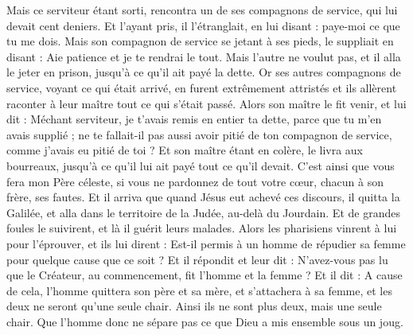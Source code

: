 \begin{multicols}{2}
Mais ce serviteur étant sorti, rencontra un de ses compagnons de service, qui lui devait cent deniers. Et l'ayant pris, il l'étranglait, en lui disant : paye-moi ce que tu me dois.
Mais son compagnon de service se jetant à ses pieds, le suppliait en disant : Aie patience et je te rendrai le tout.
Mais l'autre ne voulut pas, et il alla le jeter en prison, jusqu'à ce qu'il ait payé la dette.
Or ses autres compagnons de service, voyant ce qui était arrivé, en furent extrêmement attristés et ils allèrent raconter à leur maître tout ce qui s'était passé.
Alors son maître le fit venir, et lui dit : Méchant serviteur, je t'avais remis en entier ta dette, parce que tu m'en avais supplié ;
ne te fallait-il pas aussi avoir pitié de ton compagnon de service, comme j'avais eu pitié de toi ?
Et son maître étant en colère, le livra aux bourreaux, jusqu'à ce qu'il lui ait payé tout ce qu'il devait.
C'est ainsi que vous fera mon Père céleste, si vous ne pardonnez de tout votre cœur, chacun à son frère, ses fautes.
\VerseOne{}Et il arriva que quand Jésus eut achevé ces discours, il quitta la Galilée, et alla dans le territoire de la Judée, au-delà du Jourdain.
Et de grandes foules le suivirent, et là il guérit leurs malades.
Alors les pharisiens vinrent à lui pour l'éprouver, et ils lui dirent : Est-il permis à un homme de répudier sa femme pour quelque cause que ce soit ?
Et il répondit et leur dit : N'avez-vous pas lu que le Créateur, au commencement, fit l'homme et la femme ?
Et il dit : A cause de cela, l'homme quittera son père et sa mère, et s'attachera à sa femme, et les deux ne seront qu'une seule chair.
Ainsi ils ne sont plus deux, mais une seule chair. Que l'homme donc ne sépare pas ce que Dieu a mis ensemble sous un joug.

\end{multicols}
